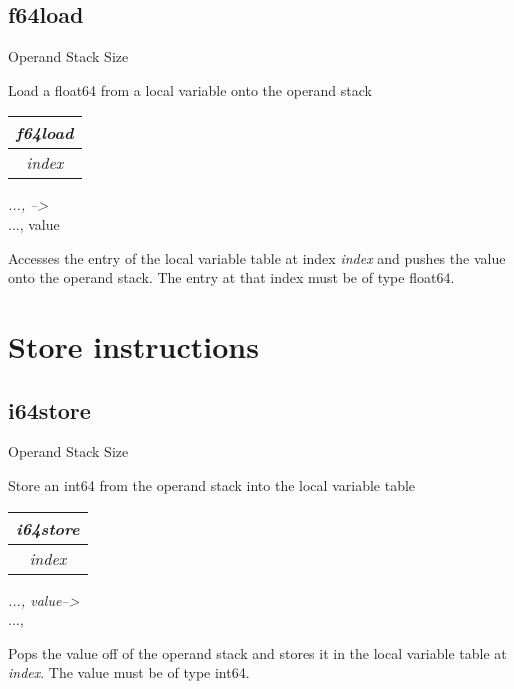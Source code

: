 \documentclass[12pt]{article}
\begin{document}
		\subsection*{f64load}
			\begin{labeling}{Operand Stack Size}
				\item [\textbf{Operation}] Load a float64 from a local variable onto the operand stack
				\item [\textbf{Format}] \begin{tabular}{| c |} \hline \textit{f64load} \\ \hline \textit{index} \\ \hline \end{tabular}
				\item [\textbf{Operand Stack}] \textit{..., --\textgreater } \\
										{..., value}
				\item [\textbf{Description}] 	Accesses the entry of the local variable table at index \textit{index} and pushes the value onto the operand stack. The entry at that index must be of type float64. 
			\end{labeling}
		\newpage 
		
	\section{Store instructions}
		\subsection*{i64store}
			\begin{labeling}{Operand Stack Size}
				\item [\textbf{Operation}] Store an int64 from the operand stack into the local variable table
				\item [\textbf{Format}] \begin{tabular}{| c |} \hline \textit{i64store} \\ \hline \textit{index} \\ \hline \end{tabular}
				\item [\textbf{Operand Stack}] \textit{..., value--\textgreater } \\
										{..., }
				\item [\textbf{Description}] Pops the value off of the operand stack and stores it in the local variable table at \textit{index}. The value must be of type int64. 
			\end{labeling}
		\newpage 
		
\end{document}
